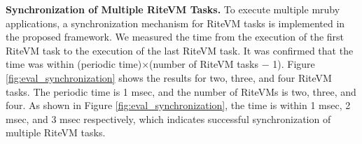 \documentclass[conference]{IEEEtran/IEEEtran/IEEEtran}
\begin{document}

{\bf Synchronization of Multiple RiteVM Tasks.}
To execute multiple mruby applications, a synchronization mechanism for RiteVM tasks is implemented in the proposed framework.
We measured the time from the execution of the first RiteVM task to the execution of the last RiteVM task.
It was confirmed that the time was within (periodic time)$\times$(number of RiteVM tasks $-$ 1).
Figure \ref{fig:eval_synchronization} shows the results for two, three, and four RiteVM tasks.
The periodic time is 1 msec, and the number of RiteVMs is two, three, and four.
As shown in Figure \ref{fig:eval_synchronization}, the time is within 1 msec, 2 msec, and 3 msec respectively, which indicates successful synchronization of multiple RiteVM tasks.
\end{document}
